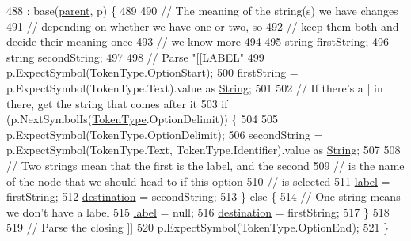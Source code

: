 \begin{DoxyCode}
488                                                                  : base(\hyperlink{a00138_af313a82103fcc2ff5a177dbb06b92f7b}{parent}, p) \{
489 
490                 \textcolor{comment}{// The meaning of the string(s) we have changes}
491                 \textcolor{comment}{// depending on whether we have one or two, so}
492                 \textcolor{comment}{// keep them both and decide their meaning once}
493                 \textcolor{comment}{// we know more}
494 
495                 \textcolor{keywordtype}{string} firstString;
496                 \textcolor{keywordtype}{string} secondString;
497 
498                 \textcolor{comment}{// Parse "[[LABEL"}
499                 p.ExpectSymbol(TokenType.OptionStart);
500                 firstString = p.ExpectSymbol(TokenType.Text).value as \hyperlink{a00041_a301aa7c866593a5b625a8fc158bbeacea27118326006d3829667a400ad23d5d98}{String};
501 
502                 \textcolor{comment}{// If there's a | in there, get the string that comes after it}
503                 \textcolor{keywordflow}{if} (p.NextSymbolIs(\hyperlink{a00041_a301aa7c866593a5b625a8fc158bbeace}{TokenType}.OptionDelimit)) \{
504 
505                     p.ExpectSymbol(TokenType.OptionDelimit);
506                     secondString = p.ExpectSymbol(TokenType.Text, TokenType.Identifier).value as 
      \hyperlink{a00041_a301aa7c866593a5b625a8fc158bbeacea27118326006d3829667a400ad23d5d98}{String};
507 
508                     \textcolor{comment}{// Two strings mean that the first is the label, and the second}
509                     \textcolor{comment}{// is the name of the node that we should head to if this option}
510                     \textcolor{comment}{// is selected}
511                     \hyperlink{a00136_a7f27d78e67fed6992767e995e70fc468}{label} = firstString;
512                     \hyperlink{a00136_abbe56fba06169901508e6c659f06c236}{destination} = secondString;
513                 \} \textcolor{keywordflow}{else} \{
514                     \textcolor{comment}{// One string means we don't have a label}
515                     \hyperlink{a00136_a7f27d78e67fed6992767e995e70fc468}{label} = null;
516                     \hyperlink{a00136_abbe56fba06169901508e6c659f06c236}{destination} = firstString;
517                 \}
518 
519                 \textcolor{comment}{// Parse the closing ]]}
520                 p.ExpectSymbol(TokenType.OptionEnd);
521             \}
\end{DoxyCode}


